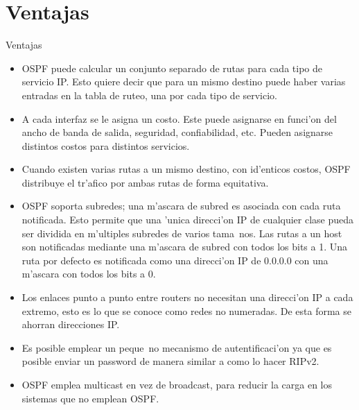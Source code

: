 \documentclass[xcolor=dvipsnames]{beamer}
\begin{document}
\section{Ventajas}	
	\begin{frame}{Ventajas}
	\scriptsize
	{
	\begin{itemize}	
	\item OSPF puede calcular un conjunto separado de rutas para cada tipo de servicio IP.
	Esto quiere decir que para un mismo destino puede haber varias entradas en la tabla 
	de ruteo, una por cada tipo de servicio. 
	\item A cada interfaz se le asigna un costo. Este puede asignarse en funci'on del ancho
	de banda de salida, seguridad, confiabilidad, etc. 
	Pueden asignarse distintos costos para distintos servicios. 
	\item Cuando existen varias rutas a un mismo destino, con id'enticos costos, 
	OSPF distribuye el tr'afico por ambas rutas de forma equitativa. 
	\item OSPF soporta subredes; una m'ascara de subred es asociada con cada ruta notificada. 
	Esto permite que una 'unica direcci'on IP de cualquier clase pueda ser dividida en m'ultiples 
	subredes de varios tama~nos. Las rutas a un host son notificadas mediante una m'ascara de 
	subred con todos los bits a 1. Una ruta por defecto es notificada como una direcci'on 
	IP de 0.0.0.0 con una m'ascara con todos los bits a 0. 
	\item Los enlaces punto a punto entre routers no necesitan una direcci'on IP a cada extremo, 
	esto es lo que se conoce como redes no numeradas. De esta forma se ahorran direcciones IP. 
	\item Es posible emplear un peque~no mecanismo de autentificaci'on ya que es posible enviar 
	un password de manera similar a como lo hacer RIPv2. 
	\item OSPF emplea multicast en vez de broadcast, para reducir la carga en los sistemas que no emplean OSPF. 
	\end{itemize}
	}
	\end{frame}
	
\end{document}
